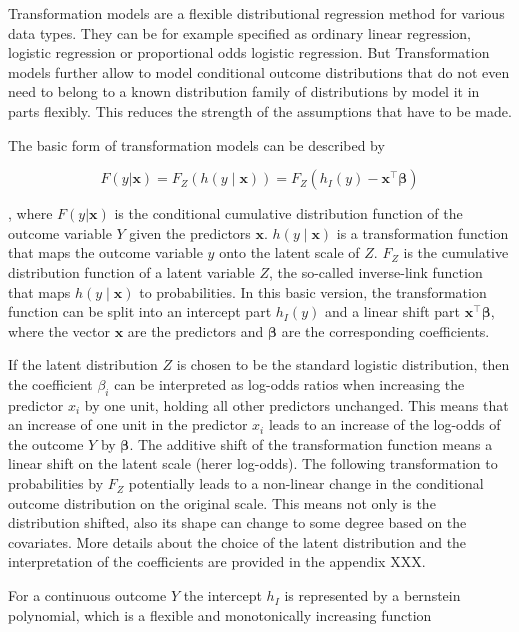 Transformation models are a flexible distributional regression method for various data types. They can be for example specified as ordinary linear regression, logistic regression or proportional odds logistic regression. But Transformation models further allow to model conditional outcome distributions that do not even need to belong to a known distribution family of distributions by model it in parts flexibly. This reduces the strength of the assumptions that have to be made.

The basic form of transformation models can be described by

\begin{equation}
F(y|\mathbf{x}) = F_Z(h(y \mid \mathbf{x})) =  F_Z(h_I(y) - \mathbf{x}^\top \boldsymbol{\beta})
\label{eq:transformation_model}
\end{equation}

, where $F(y|\mathbf{x})$ is the conditional cumulative distribution function of the outcome variable $Y$ given the predictors $\mathbf{x}$. $h(y \mid \mathbf{x})$ is a transformation function that maps the outcome variable $y$ onto the latent scale of $Z$. $F_Z$ is the cumulative distribution function of a latent variable $Z$, the so-called inverse-link function that maps $h(y \mid \mathbf{x})$ to probabilities. In this basic version, the transformation function can be split into an intercept part $h_I(y)$ and a linear shift part $\mathbf{x}^\top \boldsymbol{\beta}$, where the vector $\mathbf{x}$ are the predictors and $\boldsymbol{\beta}$ are the corresponding coefficients.

If the latent distribution $Z$ is chosen to be the standard logistic distribution, then the coefficient $\beta_i$ can be interpreted as log-odds ratios when increasing the predictor $x_i$ by one unit, holding all other predictors unchanged. This means that an increase of one unit in the predictor $x_i$ leads to an increase of the log-odds of the outcome $Y$ by $\boldsymbol{\beta}$. The additive shift of the transformation function means a linear shift on the latent scale (herer log-odds). The following transformation to probabilities by $F_Z$ potentially leads to a non-linear change in the conditional outcome distribution on the original scale. This means not only is the distribution shifted, also its shape can change to some degree based on the covariates. More details about the choice of the latent distribution and the interpretation of the coefficients are provided in the appendix XXX.


For a continuous outcome $Y$ the intercept $h_I$ is represented by a bernstein polynomial, which is a flexible and monotonically increasing function

